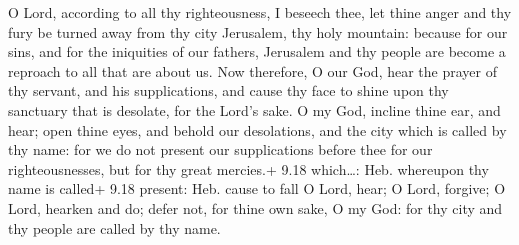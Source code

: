  O Lord, according to all thy righteousness, I beseech
thee, let thine anger and thy fury be turned away from thy city
Jerusalem, thy holy mountain: because for our sins, and for the
iniquities of our fathers, Jerusalem and thy people are become a
reproach to all that are about us.  Now therefore, O our
God, hear the prayer of thy servant, and his supplications, and cause
thy face to shine upon thy sanctuary that is desolate, for the Lord's
sake.  O my God, incline thine ear, and hear; open thine
eyes, and behold our desolations, and the city which is called by thy
name: for we do not present our supplications before thee for our
righteousnesses, but for thy great mercies.+ 9.18 which\ldots: Heb.
whereupon thy name is called+ 9.18 present: Heb. cause to fall
 O Lord, hear; O Lord, forgive; O Lord, hearken and do;
defer not, for thine own sake, O my God: for thy city and thy people are
called by thy name.

